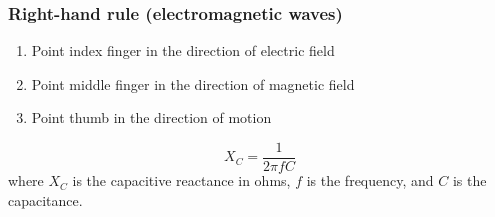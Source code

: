\documentclass[twocolumn]{article}
\begin{document}
\subsubsection*{Right-hand rule (electromagnetic waves)}
\begin{enumerate}
    \item Point index finger in the direction of electric field
    \item Point middle finger in the direction of magnetic field
    \item Point thumb in the direction of motion
\end{enumerate}

\[X_C = \frac{1}{2\pi fC}\] where $X_C$ is the capacitive reactance in ohms, $f$ is the frequency,
and $C$ is the capacitance.
\end{document}
